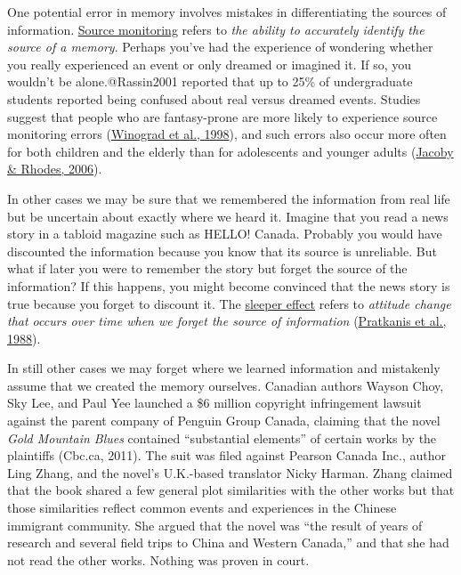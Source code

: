 \documentclass[
]{krantz}
\begin{document}
One potential error in memory involves mistakes in differentiating the sources of information. \protect\hyperlink{source-monitoring-1}{Source monitoring} refers to \emph{the ability to accurately identify the source of a memory}. Perhaps you've had the experience of wondering whether you really experienced an event or only dreamed or imagined it. If so, you wouldn't be alone.@Rassin2001 reported that up to 25\% of undergraduate students reported being confused about real versus dreamed events. Studies suggest that people who are fantasy-prone are more likely to experience source monitoring errors (\protect\hyperlink{ref-Winograd1998}{Winograd et al., 1998}), and such errors also occur more often for both children and the elderly than for adolescents and younger adults (\protect\hyperlink{ref-jacoby2006false}{Jacoby \& Rhodes, 2006}).

In other cases we may be sure that we remembered the information from real life but be uncertain about exactly where we heard it. Imagine that you read a news story in a tabloid magazine such as HELLO! Canada. Probably you would have discounted the information because you know that its source is unreliable. But what if later you were to remember the story but forget the source of the information? If this happens, you might become convinced that the news story is true because you forget to discount it. The \protect\hyperlink{sleeper-effect}{sleeper effect} refers to \emph{attitude change that occurs over time when we forget the source of information} (\protect\hyperlink{ref-Pratkanis1988}{Pratkanis et al., 1988}).

In still other cases we may forget where we learned information and mistakenly assume that we created the memory ourselves. Canadian authors Wayson Choy, Sky Lee, and Paul Yee launched a \$6 million copyright infringement lawsuit against the parent company of Penguin Group Canada, claiming that the novel \emph{Gold Mountain Blues} contained ``substantial elements'' of certain works by the plaintiffs (Cbc.ca, 2011). The suit was filed against Pearson Canada Inc., author Ling Zhang, and the novel's U.K.-based translator Nicky Harman. Zhang claimed that the book shared a few general plot similarities with the other works but that those similarities reflect common events and experiences in the Chinese immigrant community. She argued that the novel was ``the result of years of research and several field trips to China and Western Canada,'' and that she had not read the other works. Nothing was proven in court.
\end{document}
